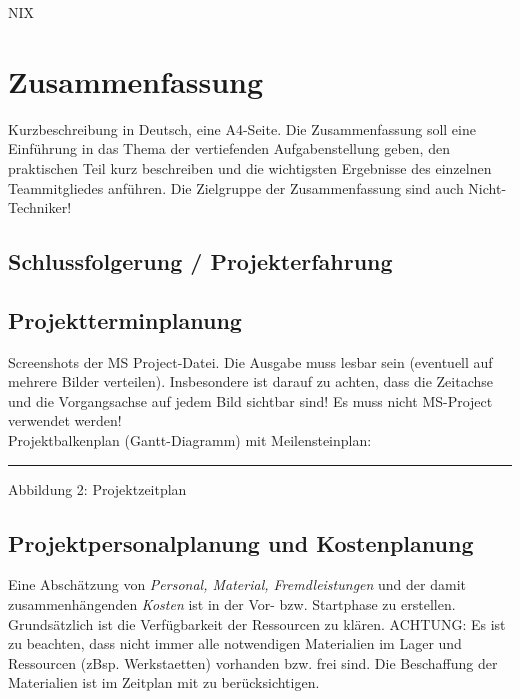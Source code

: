 \documentclass[12pt,a4paper]{article}
\newcommand{\yhbu}[0]{\color{ydkbu}}	%
\begin{document}
{%
\clearpage\vfill\newpage
	\vfill
	{\color{white} NIX}




\clearpage\vfill\newpage
\section{\sc Zusammenfassung}
	{\yhbu
	Kurzbeschreibung in Deutsch, eine A4-Seite.
	Die Zusammenfassung soll eine Einführung in das Thema
	der vertiefenden Aufgabenstellung geben,
	den praktischen Teil kurz beschreiben und die wichtigsten Ergebnisse
	des einzelnen Teammitgliedes anführen.
	Die Zielgruppe der Zusammenfassung sind auch Nicht-Techniker!
	}

 \subsection{Schlussfolgerung / Projekterfahrung}

 \subsection{Projektterminplanung}
	{\yhbu
	Screenshots der MS Project-Datei.
	Die Ausgabe muss lesbar sein (eventuell auf mehrere Bilder verteilen).
	Insbesondere ist darauf zu achten,
	dass die Zeitachse und die Vorgangsachse auf jedem Bild sichtbar sind!
	Es muss nicht MS-Project verwendet werden!
	\\[2mm]
	Projektbalkenplan (Gantt-Diagramm) mit Meilensteinplan:
	}
	\\[2mm]
	\hspace*{12mm}
	\rule{37mm}{0pt} Abbildung 2: Projektzeitplan

 \subsection{Projektpersonalplanung und Kostenplanung}
	{\yhbu
	Eine Abschätzung von
	{\em Personal, Material, Fremdleistungen}
	und der damit zusammenhängenden {\em Kosten}
	ist in der Vor- bzw. Startphase zu erstellen.
	\\[1mm]
	Grundsätzlich ist die Verfügbarkeit der Ressourcen zu klären.
	ACHTUNG: Es ist zu beachten,
	dass nicht immer alle notwendigen Materialien im Lager
	und Ressourcen (zBsp. Werkstaetten)
	vorhanden bzw. frei sind.
	Die Beschaffung der Materialien ist im Zeitplan mit zu berücksichtigen.
	}

}
\end{document}
